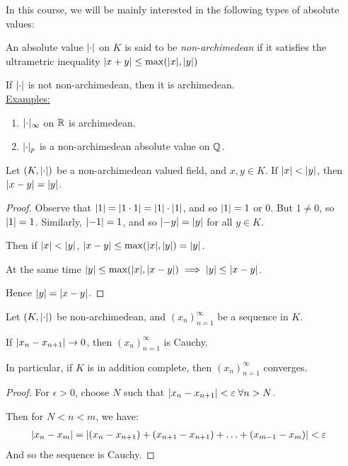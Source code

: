 \documentclass[10pt,a4paper]{article}
\begin{document}
In this course, we will be mainly interested in the following types of absolute values:
\begin{definition}
  An absolute value $\lvert\cdot\rvert$ on $K$ is said to be \emph{non-archimedean} if it satisfies the ultrametric inequality $\lvert x+y\rvert \leq \max(\lvert x\rvert, \lvert y\rvert)$
\end{definition}
If $\lvert\cdot\rvert$ is not non-archimedean, then it is archimedean.\\
\underline{Examples: }
\begin{enumerate}
  \item $\lvert\cdot\rvert_\infty$ on $\mathbb{R}$ is archimedean.
  \item $\lvert\cdot\rvert_p$ is a non-archimedean absolute value on $\mathbb{Q}$.
\end{enumerate}
\begin{lemma}
    Let $(K, \lvert\cdot\rvert)$ be a non-archimedean valued field, and $x, y \in K$. If $\lvert x\rvert<\lvert y\rvert$, then $\lvert x-y\rvert = \lvert y\rvert$.
\end{lemma}
\begin{proof}
  Observe that $\lvert1\rvert = \lvert1\cdot 1\rvert = \lvert1\rvert\cdot \lvert1\rvert$, and so $\lvert1\rvert = 1$ or $0$. But $1 \neq 0$, so $\lvert1\rvert = 1$. Similarly, $\lvert-1\rvert = 1$, and so $\lvert-y\rvert = \lvert y\rvert$ for all $y \in K$.

  Then if $\lvert x\rvert < \lvert y\rvert$,  $\lvert x-y\rvert \leq \max(\lvert x\rvert, \lvert y\rvert) = \lvert y\rvert$.

  At the same time $\lvert y\rvert \leq \max(\lvert x\rvert, \lvert x-y\rvert) \implies \lvert y\rvert \leq \lvert x-y\rvert$.

  Hence $\lvert y\rvert = \lvert x-y\rvert$.
\end{proof}

\begin{proposition}
  Let $(K, \lvert\cdot\rvert)$ be non-archimedean, and $(x_n)_{n=1}^\infty$ be a sequence in $K$.

  If $\lvert x_n-x_{n+1}\rvert \to 0$, then $(x_n)_{n=1}^\infty$ is Cauchy.

  In particular, if $K$ is in addition complete, then $(x_n)_{n=1}^\infty$ converges.
\end{proposition}
\begin{proof}
  For $\epsilon > 0$, choose $N$ such that $\abs{x_n - x_{n+1}} < \epsilon\forall n>N$.

  Then for $N < n < m$, we have:
  \begin{align*}
    \lvert x_n-x_m\rvert &= \lvert(x_n-x_{n+1}) + (x_{n+1}-x_{n+1}) +\ldots + (x_{m-1} - x_m)\rvert < \varepsilon
  \end{align*}
  And so the sequence is Cauchy.
\end{proof}
\end{document}
